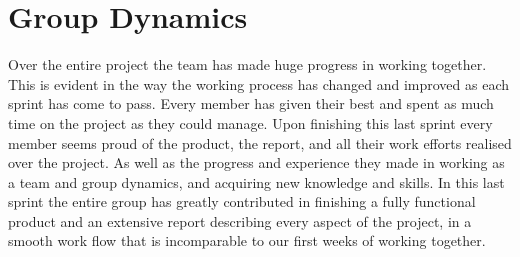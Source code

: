 \section{Group Dynamics}
\label{sec:FinalDynamics}
Over the entire project the team has made huge progress in working together. This is evident in the way the working process has changed and improved as each sprint has come to pass. Every member has given their best and spent as much time on the project as they could manage. Upon finishing this last sprint every member seems proud of the product, the report, and all their work efforts realised over the project. As well as the progress and experience they made in working as a team and group dynamics, and acquiring new knowledge and skills. In this last sprint the entire group has greatly contributed in finishing a fully functional product and an extensive report describing every aspect of the project, in a smooth work flow that is incomparable to our first weeks of working together. 